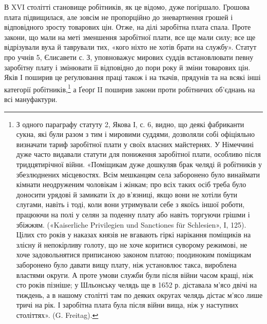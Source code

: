 В XVI столітті становище робітників, як це відомо, дуже
погіршало. Грошова плата підвищилася, але зовсім не пропорційно
до зневартнення грошей і відповідного зросту товарових цін.
Отже, на ділі заробітна плата спала. Проте закони, що мали на
меті зменшення заробітної плати, все ще мали силу; все ще відрізували
вуха й таврували тих, «кого ніхто не хотів брати на
службу». Статут про учнів 5, Єлисавети с. З, уповноважує мирових
суддів встановлювати певну заробітну плату і змінювати
її відповідно до пори року й зміни товарових цін. Яків І поширив
це реґулювання праці також і на ткачів, прядунів та на всякі
інші категорії робітників,\footnote{
З одного параграфу статуту 2, Якова І, с. 6, видно, що деякі
фабриканти сукна, які були разом з тим і мировими суддями, дозволяли
собі офіціяльно визначати тариф заробітної плати у своїх власних майстернях.
У Німеччині дуже часто видавали статути для пониження
заробітної плати, особливо після тридцятирічної війни. «Поміщикам
дуже дошкуляв брак челяді й робітників у збезлюднених місцевостях.
Всім мешканцям села заборонено було винаймати кімнати неодруженим
чоловікам і жінкам; про всіх таких осіб треба було доносити урядові
й замикати їх до в’язниці, якщо вони не хотіли бути слугами, навіть
і тоді, коли вони утримували себе з якоїсь іншої роботи, працюючи на
полі у селян за поденну плату або навіть торгуючи грішми і збіжжям.
(«Kaiserliche Privilegien und Sanctiones für Schlesien», I, 125). Цілих
сто років у наказах князів не вгавають гіркі нарікання поміщиків на
злісну й непокірливу голоту, що не хоче коритися суворому режимові,
не хоче задовольнятися приписаною законом платою; поодиноким поміщикам
заборонено було давати вищу плату, ніж установлює такса, вироблена
властями округи. А проте умови служби були після війни
часом кращі, ніж сто років пізніше; у Шльонську челядь ще в 1652 р.
діставала м’ясо двічі на тиждень, а в нашому столітті там по деяких
округах челядь дістає м’ясо лише тричі на рік. І заробітна плата була
після війни вища, ніж у наступних століттях». (G. Freitag).}
а Ґеорґ II поширив закони проти
робітничих об’єднань на всі мануфактури.

